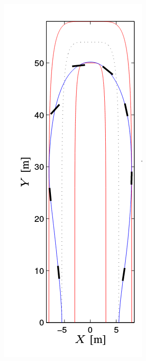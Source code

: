 \documentclass[]{beamer}
\begin{document}
\begin{frame}
\begin{columns}
\begin{figure}[ht]
\centering
\includegraphics[width=\linewidth, trim=1.5cm 0cm 0cm 0cm]{hairpin.png}
\end{figure}
\end{columns}
\end{frame}
\end{document}
